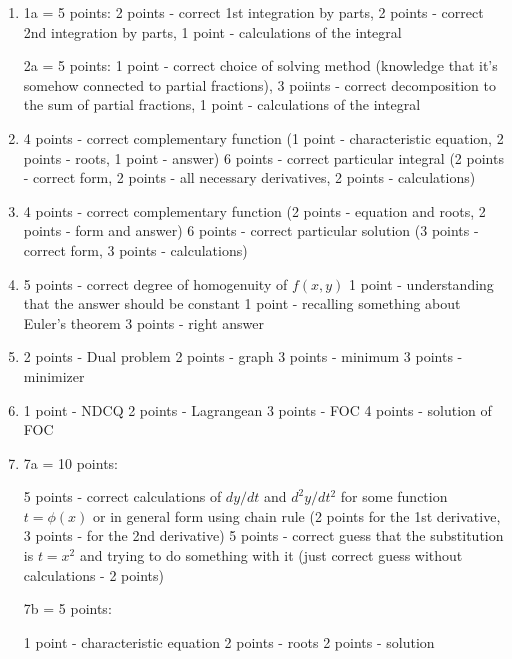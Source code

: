 \begin{enumerate}
\item
1a = 5 points: 2 points - correct 1st integration by parts, 2 points - correct 2nd integration by parts, 1 point - calculations of the integral

2a = 5 points: 1 point - correct choice of solving method (knowledge that it's somehow connected to partial fractions), 3 poiints - correct decomposition to the sum of partial fractions,  1 point - calculations of the integral

\item

4 points - correct complementary function (1 point - characteristic equation, 2 points - roots, 1 point - answer)
6 points - correct particular integral (2 points - correct form, 2 points - all necessary derivatives, 2 points - calculations)

\item

4 points - correct complementary function (2 points - equation and roots, 2 points - form and answer)
6 points - correct particular solution (3 points - correct form, 3 points - calculations)

\item

5 points - correct degree of homogenuity of $f(x,y)$
1 point - understanding that the answer should be constant
1 point - recalling something about Euler's theorem
3 points - right answer

\item

2 points - Dual problem
2 points - graph
3 points - minimum
3 points - minimizer

\item

1 point - NDCQ
2 points - Lagrangean
3 points - FOC
4 points - solution of FOC

\item

7a = 10 points:

5 points - correct calculations of $dy/dt$ and $d^2y/dt^2$ for some function $t=\phi(x)$ or in general form using chain rule (2 points for the 1st derivative, 3 points - for the 2nd derivative)
5 points - correct guess that the substitution is $t= x^2$ and trying to do something with it (just correct guess without calculations - 2 points)

7b = 5 points:

1 point - characteristic equation
2 points - roots
2 points - solution


\end{enumerate}
